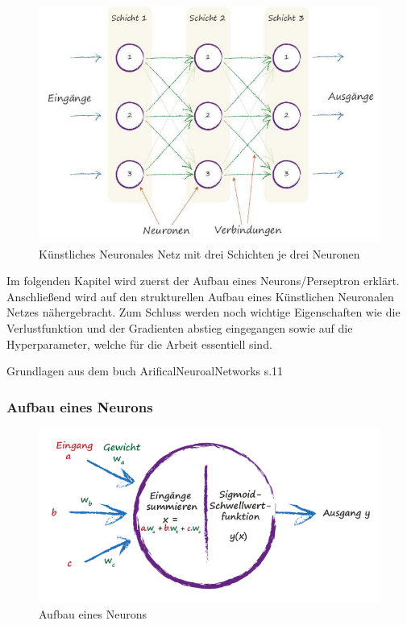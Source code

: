 \begin{figure}[htb]
  \centering  
  \includegraphics[scale=0.5]{img/S36_Buildyourown.png}
  \caption{Künstliches Neuronales Netz mit drei Schichten je drei Neuronen \cite{Rashid2017} }
  \label{fig:neural_network}
\end{figure}


Im folgenden Kapitel wird zuerst der Aufbau eines Neurons/Perseptron erklärt. Anschließend wird auf den strukturellen Aufbau eines Künstlichen Neuronalen Netzes nähergebracht. Zum Schluss werden noch wichtige Eigenschaften wie die Verlustfunktion und der Gradienten abstieg eingegangen sowie auf die Hyperparameter, welche für die Arbeit essentiell sind.



Grundlagen aus dem buch ArificalNeuroalNetworks s.11 


\subsubsection{Aufbau eines Neurons}



\begin{figure}[htb]
  \centering  
  \includegraphics[scale=0.5]{img/S41_Buildyourown.png}
  \caption{Aufbau eines Neurons \cite{Rashid2017}}
  \label{fig:neuron}
\end{figure}

